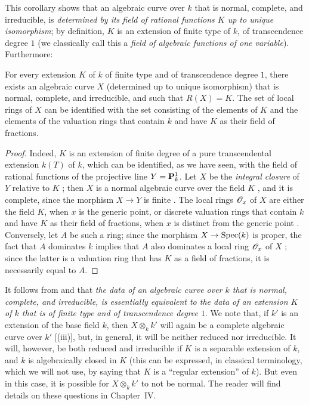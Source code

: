 \begin{env}[7.4.17]
\label{II.7.4.17}
This corollary  shows that an algebraic curve over $k$ that is normal, complete, and irreducible, is \emph{determined by its field of rational functions $K$ up to unique isomorphism};
by definition, $K$ is an extension of finite type of $k$, of transcendence degree $1$ (we classically call this a \emph{field of algebraic functions of one variable}).
Furthermore:
\end{env}

\begin{proposition}[7.4.18]
\label{II.7.4.18}
For every extension $K$ of $k$ of finite type and of transcendence degree $1$, there exists an algebraic curve $X$ (determined up to unique isomorphism) that is normal, complete, and irreducible, and such that $R(X)=K$.
The set of local rings of $X$ can be identified  with the set consisting of the elements of $K$ and the elements of the valuation rings that contain $k$ and have $K$ as their field of fractions.
\end{proposition}

\begin{proof}
Indeed, $K$ is an extension of finite degree of a pure transcendental extension $k(T)$ of $k$, which can be identified, as we have seen, with the field of rational functions of the projective line $Y=\mathbf{P}_k^1$.
Let $X$ be the \emph{integral closure} of $Y$ relative to $K$ ;
then $X$ is a normal algebraic curve over the field $K$ , and it is complete, since the morphism $X\to Y$ is finite .
The local rings $\mathscr{O}_x$ of $X$ are either the field $K$, when $x$ is the generic point, or discrete valuation rings that contain $k$ and have $K$ as their field of fractions, when $x$ is distinct from the generic point .
Conversely, let $A$ be such a ring;
since the morphism $X\to\Spec(k)$ is proper, the fact that $A$ dominates $k$ implies that $A$ also dominates a local ring $\mathscr{O}_x$ of $X$ ;
since the latter is a valuation ring that has $K$ as a field of fractions, it is necessarily equal to $A$.
\end{proof}

\begin{remarks}[7.4.19]
\label{II.7.4.19}
It follows from  and  that \emph{the data of an algebraic curve over $k$ that is normal, complete, and irreducible, is essentially equivalent to the data of an extension $K$ of $k$ that is of finite type and of transcendence degree $1$}.
We note that, if $k'$ is an extension of the base field $k$, then $X\otimes_k k'$ will again be a complete algebraic curve over $k'$ [(iii)], but, in general, it will be neither reduced nor irreducible.
It will, however, be both reduced and irreducible if $K$ is a separable extension of $k$, and $k$ is algebraically closed in $K$ (this can be expressed, in classical terminology, which we will not use, by saying that $K$ is a ``regular extension'' of $k$).
But even in this case, it is possible for $X\otimes_k k'$ to not be normal.
The reader will find details on these questions in Chapter~IV.
\end{remarks}
